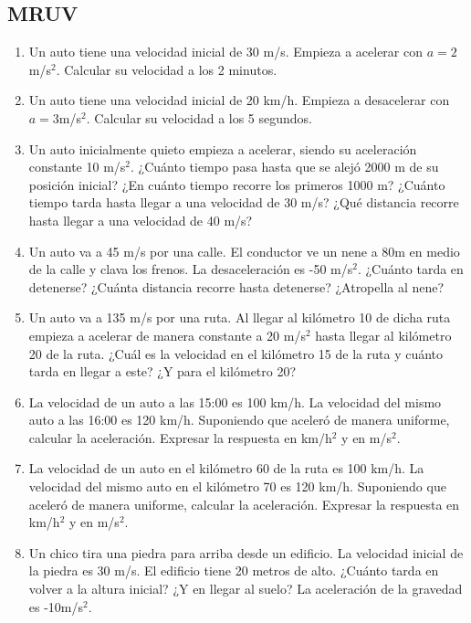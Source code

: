 \subsection{MRUV}
\begin{enumerate}
\item Un auto tiene una velocidad inicial de 30 m/s. Empieza a acelerar con $a=2$m/s$^2$. Calcular su velocidad a los 2 minutos.

\item Un auto tiene una velocidad inicial de 20 km/h. Empieza a desacelerar con $a=3$m/s$^2$. Calcular su velocidad a los 5 segundos.

\item Un auto inicialmente quieto empieza a acelerar, siendo su aceleración constante 10 m/s$^2$. ¿Cuánto tiempo pasa hasta que se alejó 2000 m de su posición inicial? ¿En cuánto tiempo recorre los primeros 1000 m? ¿Cuánto tiempo tarda hasta llegar a una velocidad de 30 m/s? ¿Qué distancia recorre hasta llegar a una velocidad de 40 m/s?

\item Un auto va a 45 m/s por una calle. El conductor ve un nene a 80m en medio de la calle y clava los frenos. La desaceleración es -50 m/s$^2$. ¿Cuánto tarda en detenerse? ¿Cuánta distancia recorre hasta detenerse? ¿Atropella al nene? 

\item Un auto va a 135 m/s por una ruta. Al llegar al kilómetro 10 de dicha ruta empieza a acelerar de manera constante a 20 m/s$^2$ hasta llegar al kilómetro 20 de la ruta. ¿Cuál es la velocidad en el kilómetro 15 de la ruta y cuánto tarda en llegar a este? ¿Y para el kilómetro 20? 

\item La velocidad de un auto a las 15:00 es 100 km/h. La velocidad del mismo auto a las 16:00 es 120 km/h. Suponiendo que aceleró de manera uniforme, calcular la aceleración. Expresar la respuesta en km/h$^2$ y en m/s$^2$.

\item La velocidad de un auto en el kilómetro 60 de la ruta es 100 km/h. La velocidad del mismo auto en el kilómetro 70 es 120 km/h. Suponiendo que aceleró de manera uniforme, calcular la aceleración. Expresar la respuesta en km/h$^2$ y en m/s$^2$. %

\item Un chico tira una piedra para arriba desde un edificio. La velocidad inicial de la piedra es 30 m/s. El edificio tiene 20 metros de alto. ¿Cuánto tarda en volver a la altura inicial? ¿Y en llegar al suelo? La aceleración de la gravedad es -10m/s$^2$. %


\end{enumerate}
